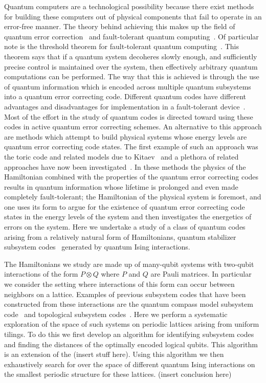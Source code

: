 \documentclass[twocolumn,showpacs,preprintnumbers,amsmath,amssymb,nofootinbib,pra,floatfix]{revtex4-1}
\begin{document}
Quantum computers are a technological possibility because there exist methods for building these computers out of physical components that fail to operate in an error-free manner.  The theory behind achieving this makes up the field of quantum error correction~\cite{Shor:95a,Steane:96a,Steane:96b,Steane:96c,Knill:97a,Gottesman:97a} and fault-tolerant quantum computing~\cite{Shor:96a,Aharonov:97a,Knill:98a,Knill:98b,Preskill:98a,Aliferis:05a}. Of particular note is the threshold theorem for fault-tolerant quantum computing~\cite{Aharonov:97a,Knill:98a,Knill:98b,Aliferis:05a}.  This theorem says that if a quantum system decoheres slowly enough, and sufficiently precise control is maintained over the system, then effectively arbitrary quantum computations can be performed.  The way that this is achieved is through the use of quantum information which is encoded across multiple quantum subsystems into a quantum error correcting code.  Different quantum codes have different advantages and disadvantages for implementation in a fault-tolerant device~\cite{Cross:07a}.  Most of the effort in the study of quantum codes is directed toward using these codes in active quantum error correcting schemes.  An alternative to this approach are methods which attempt to build physical systems whose energy levels are quantum error correcting code states.  The first example of such an approach was the toric code and related models due to Kitaev~\cite{Kitaev:97c,Kitaev:03a} and a plethora of related approaches have now been investigated~\cite{Barnes:00a,Bacon:01b,Jordan:05a,Weinstein:05b,Bacon:06a,Bacon:08b,Nayak:08a,Bombin:09a,Chesi:10a}. In these methods the physics of the Hamiltonian combined with the properties of the quantum error correcting codes results in quantum information whose lifetime is prolonged and even made completely fault-tolerant; the Hamiltonian of the physical system is foremost, and one uses its form to argue for the existence of quantum error correcting code states in the energy levels of the system and then investigates the energetics of errors on the system.  Here we undertake a study of a class of quantum codes arising from a relatively natural form of Hamiltonians, quantum stabilizer subsystem codes~\cite{Poulin:05a,Kribs:05a,Kribs:05b,Kribs:06a} generated by quantum Ising interactions.

The Hamiltonians we study are made up of many-qubit systems with two-qubit interactions of the form $P \otimes Q$ where $P$ and $Q$ are Pauli matrices.  In particular we consider the setting where interactions of this form can occur between neighbors on a lattice.  Examples of previous subsystem codes that have been constructed from these interactions are the quantum compass model subsystem code~\cite{Bacon:06a} and topological subsystem codes~\cite{Bombin:10a}.  Here we perform a systematic exploration of the space of such systems on periodic lattices arising from uniform tilings.  To do this we first develop an algorithm for identifying subsystem codes and finding the distances of the optimally encoded logical qubits.  This algorithm is an extension of the (insert stuff here).  Using this algorithm we then exhaustively search for over the space of different quantum Ising interactions on the smallest periodic structure for these lattices.   (insert conclusion here)
\end{document}
